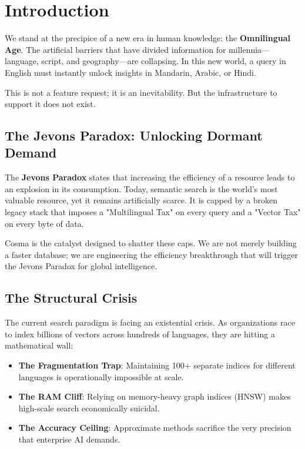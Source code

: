 \section{Introduction}

We stand at the precipice of a new era in human knowledge: the \textbf{Omnilingual Age}. The artificial barriers that have divided information for millennia—language, script, and geography—are collapsing. In this new world, a query in English must instantly unlock insights in Mandarin, Arabic, or Hindi.

This is not a feature request; it is an inevitability. But the infrastructure to support it does not exist.

\subsection{The Jevons Paradox: Unlocking Dormant Demand}

The \textbf{Jevons Paradox} states that increasing the efficiency of a resource leads to an explosion in its consumption. Today, semantic search is the world's most valuable resource, yet it remains artificially scarce. It is capped by a broken legacy stack that imposes a "Multilingual Tax" on every query and a "Vector Tax" on every byte of data.

Cosma is the catalyst designed to shatter these caps. We are not merely building a faster database; we are engineering the efficiency breakthrough that will trigger the Jevons Paradox for global intelligence.

\subsection{The Structural Crisis}

The current search paradigm is facing an existential crisis. As organizations race to index billions of vectors across hundreds of languages, they are hitting a mathematical wall:

\begin{itemize}[noitemsep]
    \item \textbf{The Fragmentation Trap}: Maintaining 100+ separate indices for different languages is operationally impossible at scale.
    \item \textbf{The RAM Cliff}: Relying on memory-heavy graph indices (HNSW) makes high-scale search economically suicidal.
    \item \textbf{The Accuracy Ceiling}: Approximate methods sacrifice the very precision that enterprise AI demands.
\end{itemize}

